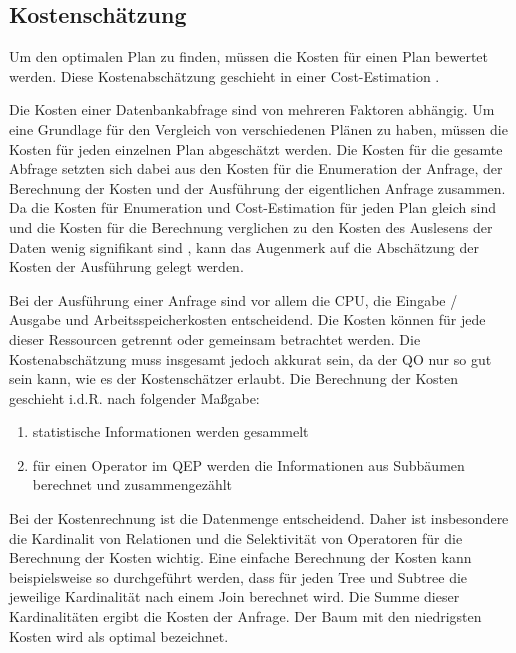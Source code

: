 \subsection{Kostenschätzung}

Um den optimalen Plan zu finden, müssen die Kosten für einen Plan bewertet werden. Diese Kostenabschätzung geschieht in einer Cost-Estimation \cite{bruno2011automated}. 

Die Kosten einer Datenbankabfrage sind von mehreren Faktoren abhängig. Um eine Grundlage für den Vergleich von verschiedenen Plänen zu haben, müssen die Kosten für jeden einzelnen Plan abgeschätzt werden. Die Kosten für die gesamte Abfrage setzten sich dabei aus den Kosten für die Enumeration der Anfrage, der Berechnung der Kosten und der Ausführung der eigentlichen Anfrage zusammen. Da die Kosten für Enumeration und Cost-Estimation für jeden Plan gleich sind und die Kosten für die Berechnung verglichen zu den Kosten des Auslesens der Daten wenig signifikant sind \cite{selinger1979access}, kann das Augenmerk auf die Abschätzung der Kosten der Ausführung gelegt werden.

Bei der Ausführung einer Anfrage sind vor allem die CPU, die Eingabe / Ausgabe und Arbeitsspeicherkosten entscheidend. Die Kosten können für jede dieser Ressourcen getrennt oder gemeinsam betrachtet werden. Die Kostenabschätzung muss insgesamt jedoch akkurat sein, da der \ac{QO} nur so gut sein kann, wie es der Kostenschätzer erlaubt. Die Berechnung der Kosten geschieht i.d.R. nach folgender Maßgabe:

\begin{enumerate}
\item statistische Informationen werden gesammelt
\item für einen Operator im \ac{QEP} werden die Informationen aus Subbäumen berechnet und zusammengezählt
\end{enumerate}

Bei der Kostenrechnung ist die Datenmenge entscheidend. Daher ist insbesondere die Kardinalit von Relationen und die Selektivität von Operatoren für die Berechnung der Kosten
wichtig. Eine einfache Berechnung der Kosten kann beispielsweise so durchgeführt werden, dass für jeden Tree und Subtree die jeweilige Kardinalität nach einem Join berechnet wird. Die Summe dieser Kardinalitäten ergibt die Kosten der Anfrage. Der Baum mit den niedrigsten Kosten wird als optimal bezeichnet.